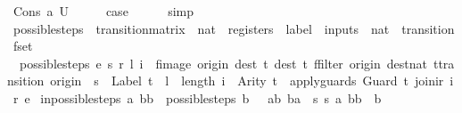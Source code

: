 \begin{isabellebody}
\ {\isacharparenleft}Cons\ a\ U{\isacharparenright}\isanewline
\ \ \isamarkupfalse%
\ \isamarkupfalse%
\ {\isacharquery}case\isanewline
\ \ \ \ \isamarkupfalse%
\ simp\isanewline
{}\isamarkupfalse%
%
\endisatagproof
{\isafoldproof}%
%
\isadelimproof
\isanewline
%
\endisadelimproof
\isanewline
{}\isamarkupfalse%
\ possible{\isacharunderscore}steps\ {\isacharcolon}{\isacharcolon}\ {\isachardoublequoteopen}transition{\isacharunderscore}matrix\ {\isasymRightarrow}\ nat\ {\isasymRightarrow}\ registers\ {\isasymRightarrow}\ label\ {\isasymRightarrow}\ inputs\ {\isasymRightarrow}\ {\isacharparenleft}nat\ {\isasymtimes}\ transition{\isacharparenright}\ fset{\isachardoublequoteclose}\ \isanewline
\ \ {\isachardoublequoteopen}possible{\isacharunderscore}steps\ e\ s\ r\ l\ i\ {\isacharequal}\ fimage\ {\isacharparenleft}{\isasymlambda}{\isacharparenleft}{\isacharparenleft}origin{\isacharcomma}\ dest{\isacharparenright}{\isacharcomma}\ t{\isacharparenright}{\isachardot}\ {\isacharparenleft}dest{\isacharcomma}\ t{\isacharparenright}{\isacharparenright}\ {\isacharparenleft}ffilter\ {\isacharparenleft}{\isasymlambda}{\isacharparenleft}{\isacharparenleft}origin{\isacharcomma}\ dest{\isacharcolon}{\isacharcolon}nat{\isacharparenright}{\isacharcomma}\ t{\isacharcolon}{\isacharcolon}transition{\isacharparenright}{\isachardot}\ origin\ {\isacharequal}\ s\ {\isasymand}\ {\isacharparenleft}Label\ t{\isacharparenright}\ {\isacharequal}\ l\ {\isasymand}\ {\isacharparenleft}length\ i{\isacharparenright}\ {\isacharequal}\ {\isacharparenleft}Arity\ t{\isacharparenright}\ {\isasymand}\ apply{\isacharunderscore}guards\ {\isacharparenleft}Guard\ t{\isacharparenright}\ {\isacharparenleft}join{\isacharunderscore}ir\ i\ r{\isacharparenright}{\isacharparenright}\ e{\isacharparenright}{\isachardoublequoteclose}\isanewline
\isanewline
{}\isamarkupfalse%
\ in{\isacharunderscore}possible{\isacharunderscore}steps{\isacharcolon}\ {\isachardoublequoteopen}{\isacharparenleft}a{\isacharcomma}\ bb{\isacharparenright}\ {\isacharbar}{\isasymin}{\isacharbar}\ possible{\isacharunderscore}steps\ b\ {}\ {\isacharless}{\isachargreater}\ ab\ ba\ {\isasymLongrightarrow}\ {\isasymexists}s{\isachardot}\ {\isacharparenleft}{\isacharparenleft}s{\isacharcomma}\ a{\isacharparenright}{\isacharcomma}\ bb{\isacharparenright}\ {\isacharbar}{\isasymin}{\isacharbar}\ b{\isachardoublequoteclose}\isanewline
%
\isadelimproof
\ \ %
\endisadelimproof
%
\isatagproof
{}\isamarkupfalse%

\end{isabellebody}
